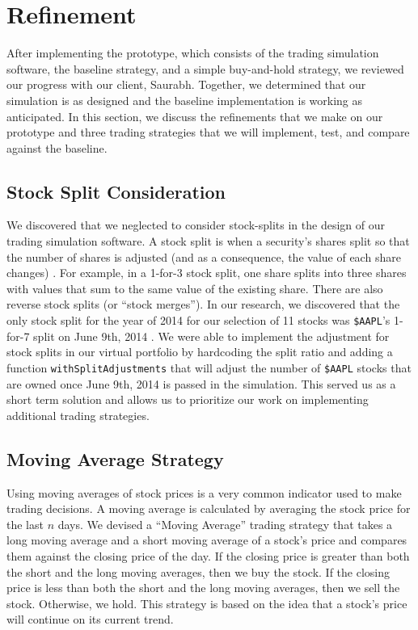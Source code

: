 
\section{Refinement}

After implementing the prototype, which consists of the trading simulation software, the baseline strategy, and a simple buy-and-hold strategy, we reviewed our progress with our client, Saurabh. Together, we determined that our simulation is as designed and the baseline implementation is working as anticipated. In this section, we discuss the refinements that we make on our prototype and three trading strategies that we will implement, test, and compare against the baseline.

\subsection{Stock Split Consideration}

We discovered that we neglected to consider stock-splits in the design of our trading simulation software. A stock split is when a security's shares split so that the number of shares is adjusted (and as a consequence, the value of each share changes) \cite{stocksplit}. For example, in a 1-for-3 stock split, one share splits into three shares with values that sum to the same value of the existing share. There are also reverse stock splits (or ``stock merges''). In our research, we discovered that the only stock split for the year of 2014 for our selection of 11 stocks was \texttt{\$AAPL}'s 1-for-7 split on June 9th, 2014 \cite{appleSplit}. We were able to implement the adjustment for stock splits in our virtual portfolio by hardcoding the split ratio and adding a function \texttt{withSplitAdjustments} that will adjust the number of \texttt{\$AAPL} stocks that are owned once June 9th, 2014 is passed in the simulation. This served us as a short term solution and allows us to prioritize our work on implementing additional trading strategies.

\subsection{Moving Average Strategy}

Using moving averages of stock prices is a very common indicator used to make trading decisions. A moving average is calculated by averaging the stock price for the last $n$ days. We devised a ``Moving Average'' trading strategy that takes a long moving average and a short moving average of a stock's price and compares them against the closing price of the day. If the closing price is greater than both the short and the long moving averages, then we buy the stock. If the closing price is less than both the short and the long moving averages, then we sell the stock. Otherwise, we hold. This strategy is based on the idea that a stock's price will continue on its current trend.

